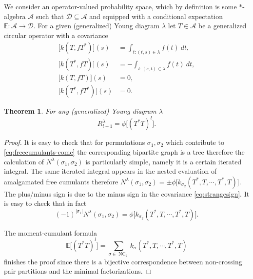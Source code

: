 \documentclass[12pt]{amsart}
\theoremstyle{plain}
\newtheorem{theorem}[lemma]{Theorem}
\theoremstyle{remark}
\newcommand{\D}{\mathcal{D}}
\newcommand{\A}{\mathcal{A}}
\newcommand{\E}{\mathbb{E}}
\newcommand{\gwia}{^\ast}
\DeclareMathOperator{\NC}{NC}
\begin{document}
We consider an operator-valued probability space, which by definition is some
$\ast$-algebra $\A$ 
such that $\D\subseteq \A$ and equipped with a conditional expectation $\E:\A\rightarrow\D$.
For a given (generalized) Young diagram $\lambda$ let $T\in\A$ be a generalized
circular operator \cite{VoiculescuDykemaNica1992,Speicher1998}
with a covariance
\begin{align}
\nonumber \big[ k(T,f T\gwia)\big] (s)&= \int_{t:  (t,s)\in\lambda }f(t)\ dt,
\\
\label{eq:strangesign}
\big[ k(T\gwia,f T)\big] (s)&= -\int_{t:  (s,t)\in\lambda }f(t)\ dt, \\
\nonumber \big[ k(T,f T)\big] (s)&= 0,\\
\nonumber \big[ k(T\gwia,f T\gwia)\big] (s)&= 0.
\end{align}






\begin{theorem}
\label{theo:free-proba-may-help}
For any (generalized) Young diagram $\lambda$
$$ R_{l+1}^{\lambda}= \phi\big[ (T\gwia T)^l \big]. $$ 
\end{theorem}
\begin{proof}
It is easy to check that for permutations $\sigma_1,\sigma_2$ which contribute
to \eqref{eq:freecumulants-come} the corresponding bipartite graph is a tree
therefore the calculation of $N^{\lambda}(\sigma_1,\sigma_2)$ is particularly
simple, namely it is a certain iterated integral. The same iterated integral
appears in the nested evaluation of amalgamated free cumulants therefore
$N^{\lambda}(\sigma_1,\sigma_2)=\pm
\phi\big[ k_{\sigma_2}(T\gwia,T,\cdots,T\gwia,T)\big]$.
The plus/minus sign is due to the minus sign in the covariance
\eqref{eq:strangesign}. It is easy to check that in fact
$$(-1)^{|\sigma_1|} N^{\lambda}(\sigma_1,\sigma_2)=
\phi\big[ k_{\sigma_2}(T\gwia,T,\cdots,T\gwia,T)\big].$$


The moment-cumulant formula 
$$\E\big[ (T\gwia T)^l \big]= \sum_{\sigma\in\NC_2}
k_{\sigma}(T\gwia,T,\cdots,T\gwia,T) $$
finishes the proof since there is a bijective correspondence between
non-crossing pair partitions and the minimal factorizations.
\end{proof}


\end{document}

